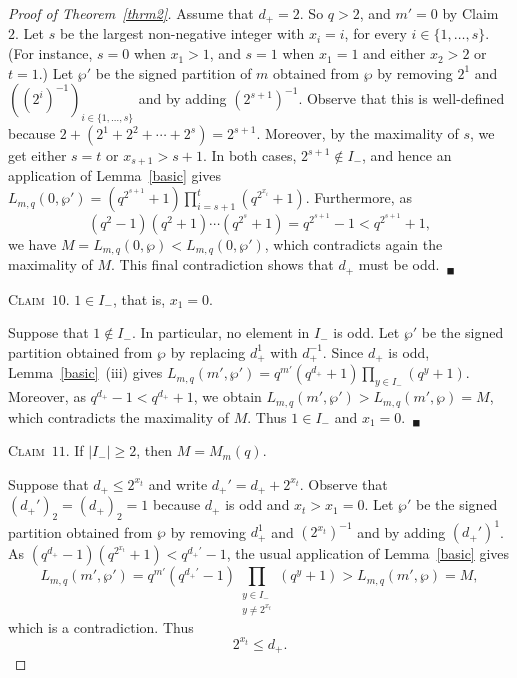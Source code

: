 \documentclass{amsart}
\begin{document}
\begin{proof}[Proof of Theorem~\ref{thrm2}]
Assume that $d_+=2$. So $q>2$, and $m'=0$ by Claim~$2$. Let $s$ be the largest non-negative integer with $x_i=i$, for every $i\in \{1,\ldots,s\}$. (For instance, $s=0$ when $x_1>1$, and $s=1$ when $x_1=1$ and either $x_2>2$ or $t=1$.) Let $\wp'$ be the signed partition of $m$ obtained from $\wp$ by removing $2^1$ and $((2^i)^{-1})_{i\in \{1,\ldots,s\}}$ and by adding  $(2^{s+1})^{-1}$. Observe that this is well-defined because $2+(2^1+2^2+\cdots +2^{s})=2^{s+1}$. Moreover, by the maximality of $s$, we get either $s=t$ or $x_{s+1}>s+1$. In both cases, $2^{s+1}\notin I_-$, and hence an application of Lemma~\ref{basic} gives $L_{m,q}(0,\wp')=(q^{2^{s+1}}+1)\prod_{i=s+1}^t(q^{2^{x_i}}+1)$. Furthermore, as $$(q^{2}-1)(q^2+1)\cdots (q^{2^s}+1)=q^{2^{s+1}}-1<q^{2^{s+1}}+1,$$ we
have  $M=L_{m,q}(0,\wp)<L_{m,q}(0,\wp')$, which contradicts again the maximality of $M$. This final contradiction shows that $d_+$ must be odd.~$_\blacksquare$  

\smallskip

\noindent\textsc{Claim~$10$. }$1\in I_-$, that is, $x_1=0$.

\smallskip

\noindent Suppose that $1\notin I_-$. In particular, no element in $I_-$ is odd. Let $\wp'$ be the signed partition obtained from $\wp$ by replacing $d_+^{1}$ with $d_+^{-1}$. Since $d_+$ is odd, Lemma~\ref{basic}~(iii) gives $L_{m,q}(m',\wp')=q^{m'}(q^{d_+}+1)\prod_{y\in I_-}(q^y+1)$. Moreover, as $q^{d_+}-1<q^{d_+}+1$, we obtain $L_{m,q}(m',\wp')>L_{m,q}(m',\wp)=M$, which contradicts the maximality of $M$. Thus $1\in I_-$ and $x_1=0$.~$_\blacksquare$  

\smallskip

\noindent\textsc{Claim~$11$. }If $|I_-|\geq 2$, then $M=M_m(q)$.

\smallskip

\noindent  Suppose that $d_+\leq 2^{x_t}$ and write $d_+'=d_++2^{x_t}$. Observe that $(d_+')_2=(d_+)_2=1$ because $d_+$ is odd and $x_t>x_1=0$. Let $\wp'$ be the signed partition obtained from $\wp$ by removing $d_+^1$ and $(2^{x_t})^{-1}$ and by adding $(d_+')^1$. As $(q^{d_+}-1)(q^{2^{x_t}}+1)<q^{d_+'}-1$, the usual application of Lemma~\ref{basic} gives $$L_{m,q}(m',\wp')=q^{m'}(q^{d_+'}-1)\prod_{\substack{y\in I_-\\y\neq 2^{x_t}}}(q^y+1)>L_{m,q}(m',\wp)=M,$$ which is a contradiction. Thus 
\begin{equation}\label{eqnew1}
2^{x_t}\leq d_+.
\end{equation}


\end{proof}
\end{document}
